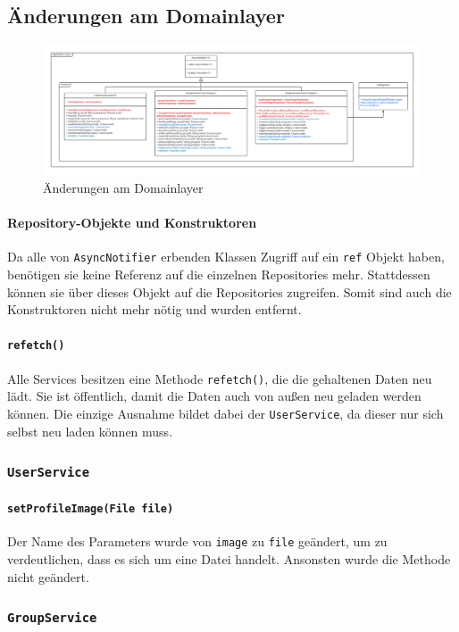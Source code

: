 \documentclass{implementierungsheft}
\begin{document}
\subsection{Änderungen am Domainlayer}
\begin{figure}[htp]
    \centering
    \includegraphics[width=\textwidth]{images/uml/domainLayer.pdf}
    \caption{Änderungen am Domainlayer}
    \label{fig:domainLayer}
\end{figure}
\paragraph{Repository-Objekte und Konstruktoren}
Da alle von \texttt{AsyncNotifier} erbenden Klassen Zugriff auf ein \texttt{ref} Objekt haben, benötigen sie keine Referenz auf die einzelnen Repositories mehr. Stattdessen können sie über dieses Objekt auf die Repositories zugreifen. Somit sind auch die Konstruktoren nicht mehr nötig und wurden entfernt.
\paragraph{\texttt{refetch()}}
Alle Services besitzen eine Methode \texttt{refetch()}, die die gehaltenen Daten neu lädt. Sie ist öffentlich, damit die Daten auch von außen neu geladen werden können. Die einzige Ausnahme bildet dabei der \texttt{UserService}, da dieser nur sich selbst neu laden können muss.
\subsubsection{\texttt{UserService}}
\paragraph*{\texttt{setProfileImage(File file)}}
Der Name des Parameters wurde von \texttt{image} zu \texttt{file} geändert, um zu verdeutlichen, dass es sich um eine Datei handelt. Ansonsten wurde die Methode nicht geändert.
\subsubsection{\texttt{GroupService}}
\end{document}
